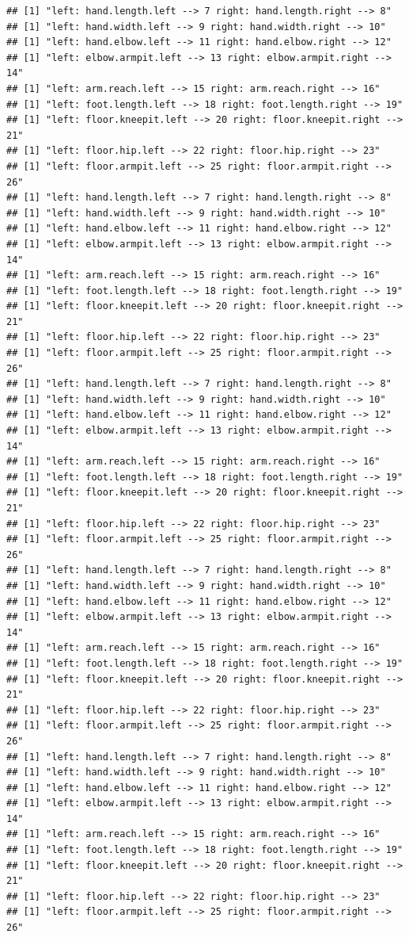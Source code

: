 \documentclass[]{article}
\begin{document}
\begin{verbatim}
## [1] "left: hand.length.left --> 7 right: hand.length.right --> 8"
## [1] "left: hand.width.left --> 9 right: hand.width.right --> 10"
## [1] "left: hand.elbow.left --> 11 right: hand.elbow.right --> 12"
## [1] "left: elbow.armpit.left --> 13 right: elbow.armpit.right --> 14"
## [1] "left: arm.reach.left --> 15 right: arm.reach.right --> 16"
## [1] "left: foot.length.left --> 18 right: foot.length.right --> 19"
## [1] "left: floor.kneepit.left --> 20 right: floor.kneepit.right --> 21"
## [1] "left: floor.hip.left --> 22 right: floor.hip.right --> 23"
## [1] "left: floor.armpit.left --> 25 right: floor.armpit.right --> 26"
## [1] "left: hand.length.left --> 7 right: hand.length.right --> 8"
## [1] "left: hand.width.left --> 9 right: hand.width.right --> 10"
## [1] "left: hand.elbow.left --> 11 right: hand.elbow.right --> 12"
## [1] "left: elbow.armpit.left --> 13 right: elbow.armpit.right --> 14"
## [1] "left: arm.reach.left --> 15 right: arm.reach.right --> 16"
## [1] "left: foot.length.left --> 18 right: foot.length.right --> 19"
## [1] "left: floor.kneepit.left --> 20 right: floor.kneepit.right --> 21"
## [1] "left: floor.hip.left --> 22 right: floor.hip.right --> 23"
## [1] "left: floor.armpit.left --> 25 right: floor.armpit.right --> 26"
## [1] "left: hand.length.left --> 7 right: hand.length.right --> 8"
## [1] "left: hand.width.left --> 9 right: hand.width.right --> 10"
## [1] "left: hand.elbow.left --> 11 right: hand.elbow.right --> 12"
## [1] "left: elbow.armpit.left --> 13 right: elbow.armpit.right --> 14"
## [1] "left: arm.reach.left --> 15 right: arm.reach.right --> 16"
## [1] "left: foot.length.left --> 18 right: foot.length.right --> 19"
## [1] "left: floor.kneepit.left --> 20 right: floor.kneepit.right --> 21"
## [1] "left: floor.hip.left --> 22 right: floor.hip.right --> 23"
## [1] "left: floor.armpit.left --> 25 right: floor.armpit.right --> 26"
## [1] "left: hand.length.left --> 7 right: hand.length.right --> 8"
## [1] "left: hand.width.left --> 9 right: hand.width.right --> 10"
## [1] "left: hand.elbow.left --> 11 right: hand.elbow.right --> 12"
## [1] "left: elbow.armpit.left --> 13 right: elbow.armpit.right --> 14"
## [1] "left: arm.reach.left --> 15 right: arm.reach.right --> 16"
## [1] "left: foot.length.left --> 18 right: foot.length.right --> 19"
## [1] "left: floor.kneepit.left --> 20 right: floor.kneepit.right --> 21"
## [1] "left: floor.hip.left --> 22 right: floor.hip.right --> 23"
## [1] "left: floor.armpit.left --> 25 right: floor.armpit.right --> 26"
## [1] "left: hand.length.left --> 7 right: hand.length.right --> 8"
## [1] "left: hand.width.left --> 9 right: hand.width.right --> 10"
## [1] "left: hand.elbow.left --> 11 right: hand.elbow.right --> 12"
## [1] "left: elbow.armpit.left --> 13 right: elbow.armpit.right --> 14"
## [1] "left: arm.reach.left --> 15 right: arm.reach.right --> 16"
## [1] "left: foot.length.left --> 18 right: foot.length.right --> 19"
## [1] "left: floor.kneepit.left --> 20 right: floor.kneepit.right --> 21"
## [1] "left: floor.hip.left --> 22 right: floor.hip.right --> 23"
## [1] "left: floor.armpit.left --> 25 right: floor.armpit.right --> 26"
\end{verbatim}
\end{document}
